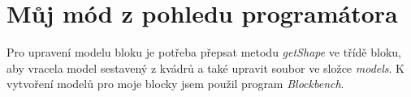 \documentclass[FM,RP]{tulthesis}
\begin{document}
        

\begin{comment}
    Můj mod je inspirován \textit{Ex Nihilo} módem. \textit{Ex Nihilo} je populární mód, který umožnuje získávat hráčům předměty z ničeho, skrz automatizaci a recyklaci. \textit{Ex Nihilo} je často používán společně s jinými módy v žánru \textit{skyblock}. V tomto žánru se hráč nachází na malém ostrově tvořeného z malého množství základních bloků. Jeho cílem je využít jeho omezené zdroje k získání nových zdrojů a rozšíření ostrovu. Většinou ostrov obsahuje hlínu a strom, který hráč může pokácet a poté znovu zasadit, čímž získá teoreticky nekonečné množství dřeva a listí. Ex Nihilo přidává do hry kompostér a sívky. Kompostér umožnuje hráči předělat listí na hlínu, Sívky umožnují hráči přesívat hlínu na rudy.
\end{comment}


\chapter{Můj mód z pohledu programátora}

\begin{comment}
    \par    Začal jsem tím že jsem do hry přidal blok pro sivku. Nejprve jsem vytvořil třídu pro blok která dědí ze třídy  \textit{Block}. Poté jsem  registroval objekt s touto třídou do registru bloků. Registrace vyžaduje jméno pro tento objekt a  konstruktor třídy \textit{Block}. Podle jména hra pak vyhledává stejnojmenné soubory v podsložkách \textit{resources}.  Pro blok je potřeba do přidat soubor do složek : \textit{blockstates}, \textit{models} a \textit{textures}. Do složky \textit{blockstates} přidám JSON soubor který obsahuje, který model má být použit v závislosti na proměnných v \textit{blockstate}.  Do složky model přidám JSON soubor, který obsahuje model bloku a odkaz na jeho textury. Soubor také může dědit z ostatních souborů, pomocí parametru \textit{parent}. Pro model krychle je zde před připravený soubor \textit{cube_all}. Ve složce \textit{textures} se nacházejí všechny textury.
\begin{comment}
    Tímto jsem přidal do hry blok, ten ale nemá žádné funkce.
\end{comment}

 \par   Pro upravení modelu bloku je potřeba přepsat metodu \textit{getShape} ve třídě bloku, aby vracela model sestavený z kvádrů a také upravit soubor ve složce \textit{models}. K vytvoření modelů pro moje blocky jsem použil program \textit{Blockbench}.
\end{document}
